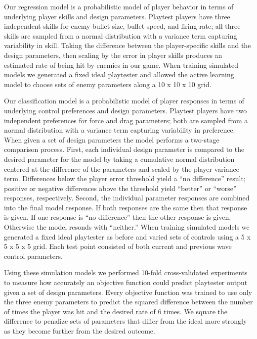 \documentclass{sig-alternate}
\begin{document}


Our regression model is a probabilistic model of player behavior in terms of underlying player skills and design parameters.
Playtest players have three independent skills for enemy bullet size, bullet speed, and firing rate; all three skills are sampled from a normal distribution with a variance term capturing variability in skill.
Taking the difference between the player-specific skills and the design parameters, then scaling by the error in player skills produces an estimated rate of being hit by enemies in our game.
When training simulated models we generated a fixed ideal playtester and allowed the active learning model to choose sets of enemy parameters along a 10 x 10 x 10 grid.



Our classification model is a probabilistic model of player responses in terms of underlying control preferences and design parameters.
Playtest players have two independent preferences for force and drag parameters; both are sampled from a normal distribution with a variance term capturing variability in preference.
When given a set of design parameters the model performs a two-stage comparison process.
First, each individual design parameter is compared to the desired parameter for the model by taking a cumulative normal distribution centered at the difference of the parameters and scaled by the player variance term.
Differences below the player error threshold yield a ``no difference'' result; positive or negative differences above the threshold yield ``better'' or ``worse'' responses, respectively.
Second, the individual parameter responses are combined into the final model response.
If both responses are the same then that response is given.
If one response is ``no difference'' then the other response is given.
Otherwise the model resonds with ``neither.''
When training simulated models we generated a fixed ideal playtester as before and varied sets of controls using a 5 x 5 x 5 x 5 grid.
Each test point consisted of both current and previous wave control parameters.



Using these simulation models we performed 10-fold cross-validated experiments to measure how accurately an objective function could predict playtester output given a set of design parameters.
Every objective function was trained to use only the three enemy parameters to predict the squared difference between the number of times the player was hit and the desired rate of 6 times.
We square the difference to penalize sets of parameters that differ from the ideal more strongly as they become further from the desired outcome.
\end{document}
